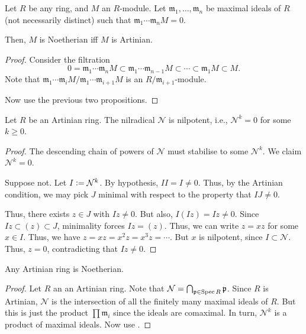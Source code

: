 \documentclass[12pt]{article}
\begin{document}
\begin{cor} \label{cor:annihilated-maximals-artinian-noetherian}
	Let $R$ be any ring, and $M$ an $R$-module. Let $\mathfrak{m}_{1}, \ldots, \mathfrak{m}_{n}$ be maximal ideals of $R$ (not necessarily distinct) such that $\mathfrak{m}_{1} \cdots \mathfrak{m}_{n} M = 0$.

	Then, $M$ is Noetherian iff $M$ is Artinian.
\end{cor}
\begin{proof} 
	Consider the filtration
	\begin{equation*} 
		0 = \mathfrak{m}_{1} \cdots \mathfrak{m}_{n} M \subset \mathfrak{m}_{1} \cdots \mathfrak{m}_{n - 1} M \subset \cdots \subset \mathfrak{m}_{1} M \subset M.
	\end{equation*}
	Note that $\mathfrak{m}_{1} \cdots \mathfrak{m}_{i} M/\mathfrak{m}_{1} \cdots \mathfrak{m}_{i + 1} M$ is an $R/\mathfrak{m}_{i + 1}$-module. 

	Now use the previous two propositions.
\end{proof}

\begin{prop}
	Let $R$ be an Artinian ring. The nilradical $\mathcal{N}$ is nilpotent, i.e., $\mathcal{N}^{k} = 0$ for some $k \ge 0$.
\end{prop}
\begin{proof} 
	The descending chain of powers of $\mathcal{N}$ must stabilise to some $\mathcal{N}^{k}$. We claim $\mathcal{N}^{k} = 0$. 

	Suppose not. Let $I \vcentcolon= \mathcal{N}^{k}$. By hypothesis, $I I = I \neq 0$. Thus, by the Artinian condition, we may pick $J$ minimal with respect to the property that $IJ \neq 0$.

	Thus, there exists $z \in J$ with $Iz \neq 0$. But also, $I(Iz) = Iz \neq 0$. \newline
	Since $Iz \subset (z) \subset J$, minimality forces $Iz = (z)$. Thus, we can write $z = xz$ for some $x \in I$. Thus, we have $z = xz = x^{2} z = x^{3} z = \cdots$. \newline
	But $x$ is nilpotent, since $I \subset \mathcal{N}$. Thus, $z = 0$, contradicting that $Iz \neq 0$.
\end{proof}

\begin{cor}
	Any Artinian ring is Noetherian.
\end{cor}
\begin{proof} 
	Let $R$ an an Artinian ring. Note that $\mathcal{N} = \bigcap_{\mathfrak{p} \in \operatorname{Spec} R} \mathfrak{p}$. Since $R$ is Artinian, $\mathcal{N}$ is the intersection of all the finitely many maximal ideals of $R$. \newline
	But this is just the product $\prod \mathfrak{m}_{i}$ since the ideals are comaximal. In turn, $\mathcal{N}^{k}$ is a product of maximal ideals. Now use .
\end{proof}
\end{document}
